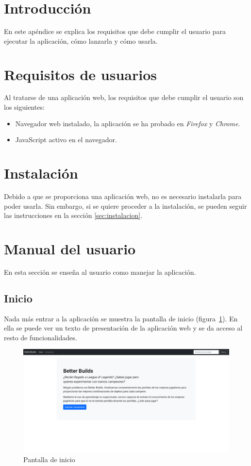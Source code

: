 
\section{Introducción}
En este apéndice se explica los requisitos que debe cumplir el usuario para ejecutar la aplicación, cómo lanzarla y cómo usarla.

\section{Requisitos de usuarios}
Al tratarse de una aplicación web, los requisitos que debe cumplir el usuario son los siguientes:

\begin{itemize}
	\tightlist
	\item Navegador web instalado, la aplicación se ha probado en \textit{Firefox} y \textit{Chrome}.
	\item JavaScript activo en el navegador.
\end{itemize}


\section{Instalación}
Debido a que se proporciona una aplicación web, no es necesario instalarla para poder usarla. Sin embargo, si se quiere proceder a la instalación, se pueden seguir las instrucciones en la sección \ref{sec:instalacion}.


\section{Manual del usuario}
En esta sección se enseña al usuario como manejar la aplicación.

\subsection{Inicio}
Nada más entrar a la aplicación se muestra la pantalla de inicio (figura~\ref{fig:inicio}). En ella se puede ver un texto de presentación de la aplicación web y se da acceso al resto de funcionalidades.

\begin{figure}[h]
	\centering
	\includegraphics[width=1\linewidth]{img/0.inicio}
	\caption{Pantalla de inicio}
	\label{fig:inicio}
\end{figure}

